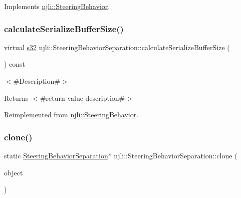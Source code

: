 Implements \mbox{\hyperlink{classnjli_1_1_steering_behavior_a9720953de1268f658636213946d76ed3}{njli\+::\+Steering\+Behavior}}.

\mbox{\label{classnjli_1_1_steering_behavior_separation_a48e1a87903d1827801778137043d52d8}} 
\subsubsection{\texorpdfstring{calculate\+Serialize\+Buffer\+Size()}{calculateSerializeBufferSize()}}
{\footnotesize\ttfamily virtual \mbox{\hyperlink{_util_8h_aa62c75d314a0d1f37f79c4b73b2292e2}{s32}} njli\+::\+Steering\+Behavior\+Separation\+::calculate\+Serialize\+Buffer\+Size (\begin{DoxyParamCaption}{ }\end{DoxyParamCaption}) const\hspace{0.3cm}{\ttfamily [virtual]}}

$<$\#\+Description\#$>$

\begin{DoxyReturn}{Returns}
$<$\#return value description\#$>$ 
\end{DoxyReturn}


Reimplemented from \mbox{\hyperlink{classnjli_1_1_steering_behavior_abbc461d853c1b225cfde5b79d96d11bd}{njli\+::\+Steering\+Behavior}}.

\mbox{\label{classnjli_1_1_steering_behavior_separation_a2053f3c1a9fe4f8d65bce940be50a7fd}} 
\subsubsection{\texorpdfstring{clone()}{clone()}}
{\footnotesize\ttfamily static \mbox{\hyperlink{classnjli_1_1_steering_behavior_separation}{Steering\+Behavior\+Separation}}$\ast$ njli\+::\+Steering\+Behavior\+Separation\+::clone (\begin{DoxyParamCaption}\item[{const \mbox{\hyperlink{classnjli_1_1_steering_behavior_separation}{Steering\+Behavior\+Separation}} \&}]{object }\end{DoxyParamCaption})\hspace{0.3cm}{\ttfamily [static]}}



